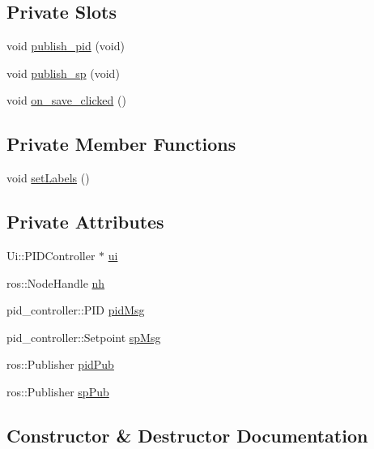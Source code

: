 \subsection*{Private Slots}
\begin{DoxyCompactItemize}
\item 
void \hyperlink{classPIDController_ade90bc131741e00557e451e6b9d1648a}{publish\+\_\+pid} (void)
\item 
void \hyperlink{classPIDController_a279b52c4397a08bf3f7b86e7c54be220}{publish\+\_\+sp} (void)
\item 
void \hyperlink{classPIDController_a19820873ff56f5ff1b90c99ee4e0f52a}{on\+\_\+save\+\_\+clicked} ()
\end{DoxyCompactItemize}
\subsection*{Private Member Functions}
\begin{DoxyCompactItemize}
\item 
void \hyperlink{classPIDController_a41e8633c307a58f92df4c83bd08245c7}{set\+Labels} ()
\end{DoxyCompactItemize}
\subsection*{Private Attributes}
\begin{DoxyCompactItemize}
\item 
Ui\+::\+P\+I\+D\+Controller $\ast$ \hyperlink{classPIDController_a7e321e72a5082ba2c08b5ab05bea4009}{ui}
\item 
ros\+::\+Node\+Handle \hyperlink{classPIDController_a8ea098f5941b9a06d144d48a14d97ca4}{nh}
\item 
pid\+\_\+controller\+::\+P\+ID \hyperlink{classPIDController_a5f63a9fbeb425aade050320b98d2fcd0}{pid\+Msg}
\item 
pid\+\_\+controller\+::\+Setpoint \hyperlink{classPIDController_ac855862250d6358a44640f65245d8d6e}{sp\+Msg}
\item 
ros\+::\+Publisher \hyperlink{classPIDController_a4277721bfad5b5cd838312b62aadb1f8}{pid\+Pub}
\item 
ros\+::\+Publisher \hyperlink{classPIDController_aeb778d197e52ca65c1a593deddec0e78}{sp\+Pub}
\end{DoxyCompactItemize}


\subsection{Constructor \& Destructor Documentation}
